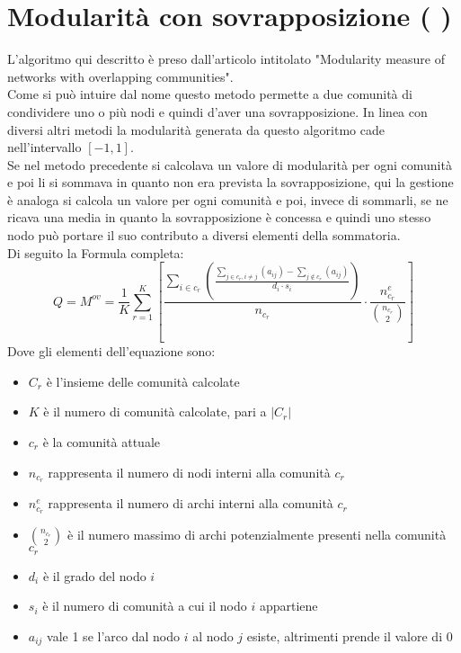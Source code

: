 \section{Modularità con sovrapposizione ( \mover )}
L'algoritmo qui descritto è preso dall'articolo intitolato "Modularity measure of networks with overlapping communities"\cite{M-over_paper}.\\
Come si può intuire dal nome questo metodo permette a due comunità di condividere uno o più nodi e quindi d'aver una sovrapposizione. In linea con diversi altri metodi la modularità generata da questo algoritmo cade nell'intervallo $[-1, 1]$.\\
Se nel metodo precedente si calcolava un valore di modularità per ogni comunità e poi li si sommava in quanto non era prevista la sovrapposizione, qui la gestione è analoga si calcola un valore per ogni comunità e poi, invece di sommarli, se ne ricava una media in quanto la sovrapposizione è concessa e quindi uno stesso nodo può portare il suo contributo a diversi elementi della sommatoria.\\
Di seguito la Formula completa:
\begin{equation}
	Q = M^{ov} = \frac{1}{K} 
	\sum_{r=1}^{K} \left[
		\frac
			{\sum\limits_{i \in c_r} 
				\left( \frac
					{
						\sum\limits_{j \in c_r, i \neq j} \left( a_{ij} \right) 
						- 
						\sum\limits_{j \notin c_r} \left( a_{ij} \right) 
					} 
					{d_i \cdot s_i} 
				\right) } 
			{n_{c_r}}
		\cdot
		\frac{ n^e_{c_r} }{ \binom{n_{c_r}}{2} } 
	\right]
	\label{eq:m_over}
\end{equation}
Dove gli elementi dell'equazione sono:
\begin{itemize}
	\item $C_r$ è l'insieme delle comunità calcolate
	\item $K$ è il numero di comunità calcolate, pari a $|C_r|$
	\item $c_r$ è la comunità attuale
	\item $n_{c_r}$ rappresenta il numero di nodi interni alla comunità $c_r$
	\item $n^e_{c_r}$ rappresenta il numero di archi interni alla comunità $c_r$
	\item $\binom{n_{c_r}}{2}$ è il numero massimo di archi potenzialmente presenti nella comunità $c_r$
	\item $d_i$ è il grado del nodo $i$
	\item $s_i$ è il numero di comunità a cui il nodo $i$ appartiene
	\item $a_{ij}$ vale 1 se l'arco dal nodo $i$ al nodo $j$ esiste, altrimenti prende il valore di 0
\end{itemize}
